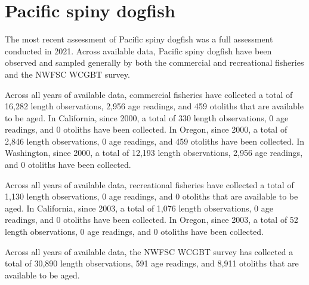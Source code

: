 \documentclass[11pt,
  english,
  letterpaper,
]{article}
\begin{document}

\hypertarget{pacific-spiny-dogfish}{%
\section{Pacific spiny dogfish}\label{pacific-spiny-dogfish}}

\leavevmode\tagmcend\tagstructend


The most recent assessment of Pacific spiny dogfish was a full assessment conducted in 2021. Across available data, Pacific spiny dogfish have been observed and sampled generally by both the commercial and recreational fisheries and the NWFSC WCGBT survey.

\leavevmode\tagmcend\tagstructend\par


Across all years of available data, commercial fisheries have collected a total of 16,282 length observations, 2,956 age readings, and 459 otoliths that are available to be aged. In California, since 2000, a total of 330 length observations, 0 age readings, and 0 otoliths have been collected. In Oregon, since 2000, a total of 2,846 length observations, 0 age readings, and 459 otoliths have been collected. In Washington, since 2000, a total of 12,193 length observations, 2,956 age readings, and 0 otoliths have been collected.

\leavevmode\tagmcend\tagstructend\par


Across all years of available data, recreational fisheries have collected a total of 1,130 length observations, 0 age readings, and 0 otoliths that are available to be aged. In California, since 2003, a total of 1,076 length observations, 0 age readings, and 0 otoliths have been collected. In Oregon, since 2003, a total of 52 length observations, 0 age readings, and 0 otoliths have been collected.

\leavevmode\tagmcend\tagstructend\par


Across all years of available data, the NWFSC WCGBT survey has collected a total of 30,890 length observations, 591 age readings, and 8,911 otoliths that are available to be aged.
\end{document}
